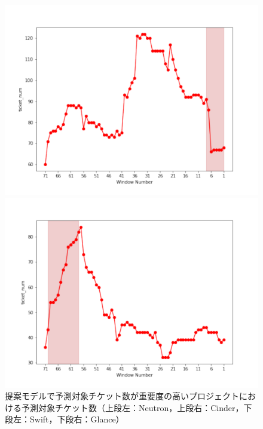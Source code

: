 \documentclass[submit]{ipsj}
\begin{document}
\begin{figure}[t]
\begin{minipage}{.23\textwidth}
    \includegraphics[width=1.1\columnwidth]{Uenaka_fig/RQ2_kousatu/Swift_ticket_num.pdf}
\end{minipage}
\hfill
\begin{minipage}{.23\textwidth}
    \includegraphics[width=1.1\columnwidth]{Uenaka_fig/RQ2_kousatu/Glance_ticket_num.pdf}
\end{minipage}
  \caption{提案モデルで予測対象チケット数が重要度の高いプロジェクトにおける予測対象チケット数（上段左：Neutron，上段右：Cinder，下段左：Swift，下段右：Glance）}
    \label{fig:review_ticket_num}
\end{figure}
\end{document}
